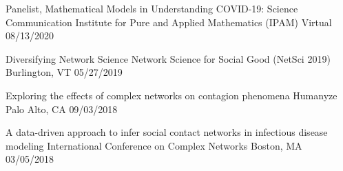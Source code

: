 \vspace{-5mm}

\begin{cventries}
  \cvpresentation
    {Panelist, Mathematical Models in Understanding COVID-19: Science Communication} %
    {Institute for Pure and Applied Mathematics (IPAM)} %
    {Virtual} %
    {08/13/2020} %
\vspace{-1.mm}

  \cvpresentation
    {Diversifying Network Science} %
    {Network Science for Social Good (NetSci 2019)} %
    {Burlington, VT} %
    {05/27/2019} %
\vspace{-1.mm}


  \cvpresentation
    {Exploring the effects of complex networks on contagion phenomena} %
    {Humanyze} %
    {Palo Alto, CA} %
    {09/03/2018} %
\vspace{-1.mm}

  \cvpresentation
    {A data-driven approach to infer social contact networks in infectious disease modeling} %
    {International Conference on Complex Networks} %
    {Boston, MA} %
    {03/05/2018} %
\vspace{-1.mm}


\end{cventries}
